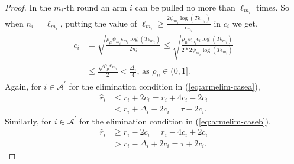 \begin{proof}
In the $m_{i}$-th round an arm $i$ can be pulled no more than $\ell_{m_{i}}$ times. So when $n_{i}=\ell_{m_{i}}$, putting the value of $\ell_{m_{i}}\ge\frac{2\psi_{m_i}\log{( T\epsilon_{m_{i}})}}{\epsilon_{m_{i}}}$ in $c_{i}$ we get, 
\begin{align*}
c_{i}
&=\sqrt{\frac{\rho_{\mu}\psi_{m_i}\epsilon_{m_{i}}\log ( T\epsilon_{m_{i}})}{2 n_{i}}}
\le\sqrt{\frac{\rho_{\mu}\psi_{m_i}\epsilon_{i}\log ( T\epsilon_{m_{i}})}{2*2 \psi_{m_i} \log( T\epsilon_{m_{i}})}}\\
& \le\frac{\sqrt{\rho_{\mu}\epsilon_{m_{i}}}}{2}
< \frac{\Delta_{i}}{4} \text{, as }\rho_{\mu}\in (0,1].
\end{align*}
Again, for ${i} \in \mathcal{A}^{'}$ for the  elimination condition in (\ref{eq:armelim-casea}), 
\begin{align*}
\hat{r}_{i} &\leq r_{i} + 2c_{i} = r_{i} + 4c_{i} - 2c_{i} \\
&< r_{i} + \Delta_{i} - 2c_{i} = \tau -2c_{i}.
\end{align*}
Similarly, for ${i} \in \mathcal{A}^{'}$ for the  elimination condition in (\ref{eq:armelim-caseb}), 
\begin{align*}
\hat{r}_{i} &\geq r_{i} - 2c_{i} = r_{i} - 4c_{i} + 2c_{i} \\
&> r_{i} - \Delta_{i} + 2c_{i}= \tau + 2c_{i}.
\end{align*}



\end{proof}
